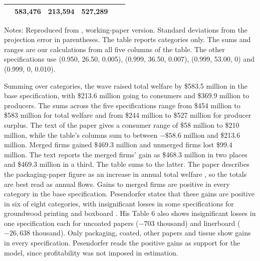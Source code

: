 \begin{table}[htbp]
\begin{threeparttable}
\begin{tabular}{@{}lrrrrr@{}}
 & 583,476 & 213,594 & 527,289 & & \\
\bottomrule
\end{tabular}
\begin{tablenotes}[flushleft]
\footnotesize
\item Notes: Reproduced from \citet[Table 6, specification (1): depreciation factor 0.999, linear investment-cost
coefficient 26.50, quadratic 0.005]{Pesendorfer2003}, working-paper version. Standard deviations from the projection
error in parentheses. The table reports categories only. The sums and ranges are our calculations from all five
columns of the table. The other specifications use (0.950, 26.50, 0.005), (0.999, 36.50, 0.007), (0.999, 53.00, 0)
and (0.999, 0, 0.010).
\end{tablenotes}
\end{threeparttable}
\end{table}

Summing over categories, the wave raised total welfare by \$583.5 million in the base specification, with \$213.6
million going to consumers and \$369.9 million to producers. The sums across the five specifications range from \$454
million to \$583 million for total welfare and from \$244 million to \$527 million for producer surplus. The text of the
paper gives a consumer range of \$58 million to \$210 million, while the table's columns sum to between $-\$58.6$ million
and \$213.6 million.
Merged firms gained \$469.3 million and unmerged firms lost \$99.4 million.
The text reports the merged firms' gain as \$468.3 million in two places and \$469.3 million in a third. The table
sums to the latter. The paper describes the packaging-paper figure as an increase in annual total welfare
\citep[p.~19]{Pesendorfer2003}, so the totals are best read as annual flows. Gains to merged firms are positive in every
category in the base specification. Pesendorfer states that these gains are positive in six of eight categories, with
insignificant losses in some specifications for groundwood printing and boxboard \citep[p.~21]{Pesendorfer2003}. His
Table 6 also shows insignificant losses in one specification each for uncoated papers ($-703$ thousand) and
linerboard ($-26{,}638$ thousand). Only packaging, coated, other papers and tissue show gains in every specification.
Pesendorfer reads the positive gains as support for the model, since profitability was not imposed in estimation.

